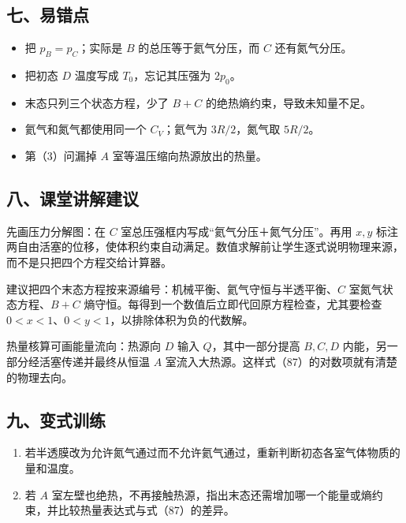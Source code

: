 \documentclass[12pt,a4paper,UTF8]{ctexart}
\newcommand{\tightlist}{\setlength{\itemsep}{0pt}\setlength{\parskip}{0pt}}
\begin{document}
\subsection{七、易错点}\label{ux4e03ux6613ux9519ux70b9-5}

\begin{itemize}
\tightlist
\item
  把 \(p_B=p_C\)；实际是 \(B\) 的总压等于氦气分压，而 \(C\)
  还有氮气分压。
\item
  把初态 \(D\) 温度写成 \(T_0\)，忘记其压强为 \(2p_0\)。
\item
  末态只列三个状态方程，少了 \(B+C\) 的绝热熵约束，导致未知量不足。
\item
  氦气和氮气都使用同一个 \(C_V\)；氦气为 \(3R/2\)，氮气取 \(5R/2\)。
\item
  第（3）问漏掉 \(A\) 室等温压缩向热源放出的热量。
\end{itemize}

\subsection{八、课堂讲解建议}\label{ux516bux8bfeux5802ux8bb2ux89e3ux5efaux8bae-5}

先画压力分解图：在 \(C\) 室总压强框内写成``氦气分压＋氮气分压''。再用
\(x,y\)
标注两自由活塞的位移，使体积约束自动满足。数值求解前让学生逐式说明物理来源，而不是只把四个方程交给计算器。

建议把四个末态方程按来源编号：机械平衡、氦气守恒与半透平衡、\(C\)
室氮气状态方程、\(B+C\)
熵守恒。每得到一个数值后立即代回原方程检查，尤其要检查
\(0<x<1\)、\(0<y<1\)，以排除体积为负的代数解。

热量核算可画能量流向：热源向 \(D\) 输入 \(Q\)，其中一部分提高 \(B,C,D\)
内能，另一部分经活塞传递并最终从恒温 \(A\)
室流入大热源。这样式（87）的对数项就有清楚的物理去向。

\subsection{九、变式训练}\label{ux4e5dux53d8ux5f0fux8badux7ec3-5}

\begin{enumerate}
\def\labelenumi{\arabic{enumi}.}
\tightlist
\item
  若半透膜改为允许氮气通过而不允许氦气通过，重新判断初态各室气体物质的量和温度。
\item
  若 \(A\)
  室左壁也绝热，不再接触热源，指出末态还需增加哪一个能量或熵约束，并比较热量表达式与式（87）的差异。
\end{enumerate}
\end{document}
